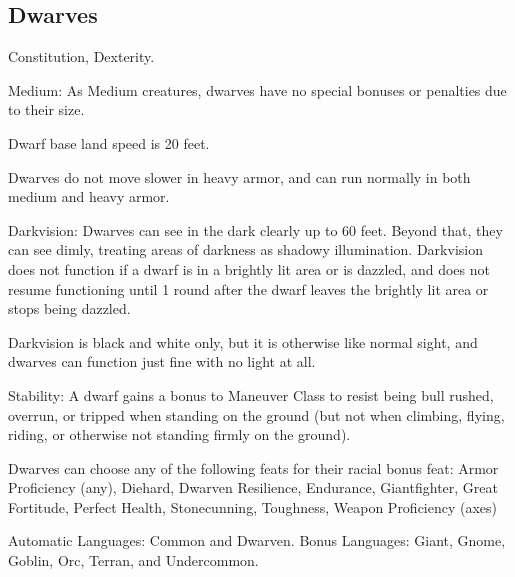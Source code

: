 \subsection{Dwarves}
\begin{itemize*}
\item {} Constitution,  Dexterity.
\item Medium: As Medium creatures, dwarves have no special bonuses or penalties due to their size.
\item Dwarf base land speed is 20 feet.
\item Dwarves do not move slower in heavy armor, and can run normally in both medium and heavy armor.
\item Darkvision: Dwarves can see in the dark clearly up to 60 feet.   Beyond that, they can see dimly, treating areas of darkness as shadowy illumination. Darkvision does not function if a dwarf is in a brightly lit area or is dazzled, and does not resume functioning until 1 round after the dwarf leaves the brightly lit area or stops being dazzled.
\par Darkvision is black and white only, but it is otherwise like normal sight, and dwarves can function just fine with no light at all.
\item Stability: A dwarf gains a  bonus to Maneuver Class to resist being bull rushed, overrun, or tripped when standing on the ground (but not when climbing, flying, riding, or otherwise not standing firmly on the ground).
\item Dwarves can choose any of the following feats for their racial bonus feat: Armor Proficiency (any), Diehard, Dwarven Resilience, Endurance, Giantfighter, Great Fortitude, Perfect Health, Stonecunning, Toughness, Weapon Proficiency (axes)
\item Automatic Languages: Common and Dwarven. Bonus Languages: Giant, Gnome, Goblin, Orc, Terran, and Undercommon.
\end{itemize*}

